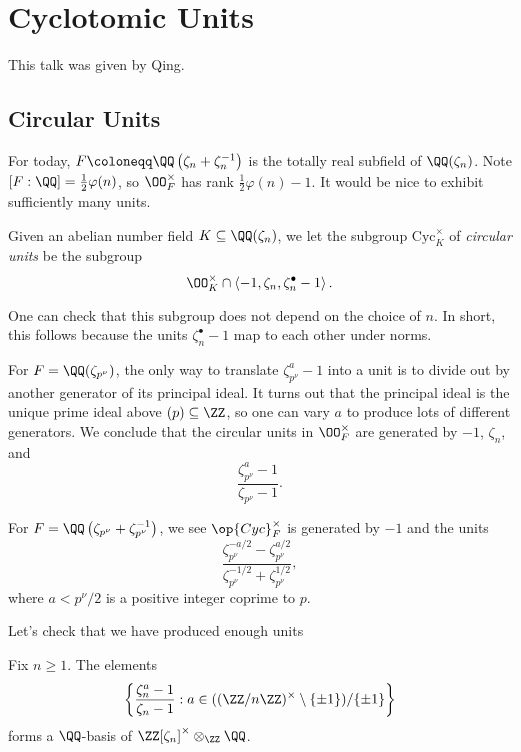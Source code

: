 \documentclass{article}
\begin{document}
\section{Cyclotomic Units}
This talk was given by Qing.

\subsection{Circular Units}
For today, $F\coloneqq\QQ\left(\zeta_n+\zeta_n^{-1}\right)$ is the totally real subfield of $\QQ(\zeta_n)$. Note $[F:\QQ]=\frac12\varphi(n)$, so $\OO_F^\times$ has rank $\frac12\varphi(n)-1$. It would be nice to exhibit sufficiently many units.
\begin{definition}
	Given an abelian number field $K\subseteq\QQ(\zeta_n)$, we let the subgroup $\mathrm{Cyc}_K^\times$ of \textit{circular units} be the subgroup
	\[\OO_K^\times\cap\left\langle-1,\zeta_n,\zeta_n^\bullet-1\right\rangle.\]
\end{definition}
\begin{remark}
	One can check that this subgroup does not depend on the choice of $n$. In short, this follows because the units $\zeta_n^\bullet-1$ map to each other under norms.
\end{remark}
\begin{example}
	For $F=\QQ(\zeta_{p^\nu})$, the only way to translate $\zeta_{p^\nu}^a-1$ into a unit is to divide out by another generator of its principal ideal. It turns out that the principal ideal is the unique prime ideal above $(p)\subseteq\ZZ$, so one can vary $a$ to produce lots of different generators. We conclude that the circular units in $\OO_F^\times$ are generated by $-1$, $\zeta_n$, and
	\[\frac{\zeta_{p^\nu}^a-1}{\zeta_{p^\nu}-1}.\]
\end{example}
\begin{example}
	For $F=\QQ\left(\zeta_{p^\nu}+\zeta_{p^\nu}^{-1}\right)$, we see $\op{Cyc}_F^\times$ is generated by $-1$ and the units
	\[\frac{\zeta_{p^\nu}^{-a/2}-\zeta_{p^\nu}^{a/2}}{\zeta_{p^\nu}^{-1/2}+\zeta_{p^\nu}^{1/2}},\]
	where $a<p^\nu/2$ is a positive integer coprime to $p$.
\end{example}
Let's check that we have produced enough units
\begin{theorem}
	Fix $n\ge1$. The elements
	\[\left\{\frac{\zeta_n^a-1}{\zeta_n-1}:a\in((\ZZ/n\ZZ)^\times\setminus\{\pm1\})/\{\pm1\}\right\}\]
	forms a $\QQ$-basis of $\ZZ[\zeta_n]^\times\otimes_\ZZ\QQ$.
\end{theorem}
\end{document}
